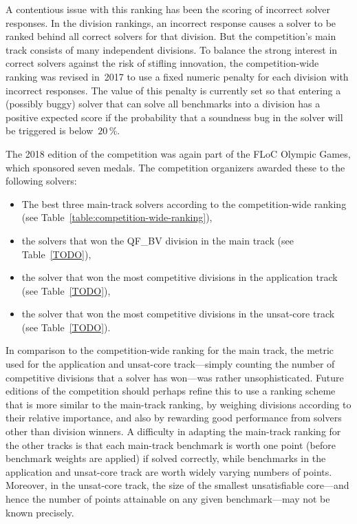 \documentclass[twoside,11pt]{article}
\begin{document}
A contentious issue with this ranking has been the scoring of
incorrect solver responses.  In the division rankings, an incorrect
response causes a solver to be ranked behind all correct solvers for
that division.  But the competition's main track consists of many
independent divisions.  To balance the strong interest in correct
solvers against the risk of stifling innovation, the competition-wide
ranking was revised in~2017 to use a fixed numeric penalty for each
division with incorrect responses.  The value of this penalty is
currently set so that entering a (possibly buggy) solver that can
solve all benchmarks into a division has a positive expected score if
the probability that a soundness bug in the solver will be triggered
is below~$20\,\%$.~\cite{rules18}

The 2018 edition of the competition was again part of the FLoC Olympic
Games, which sponsored seven medals.  The competition organizers
awarded these to the following solvers:
\begin{itemize}
\item The best three main-track solvers according to the
  competition-wide ranking (see
  Table~\ref{table:competition-wide-ranking}),
\item the solvers that won the QF\_BV division in the main track (see
  Table~\ref{TODO}),
\item the solver that won the most competitive divisions in the
  application track (see Table~\ref{TODO}),
\item the solver that won the most competitive divisions in the
  unsat-core track (see Table~\ref{TODO}).
\end{itemize}


In comparison to the competition-wide ranking for the main track, the
metric used for the application and unsat-core track---simply counting
the number of competitive divisions that a solver has won---was rather
unsophisticated.  Future editions of the competition should perhaps
refine this to use a ranking scheme that is more similar to the
main-track ranking, by weighing divisions according to their relative
importance, and also by rewarding good performance from solvers other
than division winners.  A difficulty in adapting the main-track
ranking for the other tracks is that each main-track benchmark is
worth one point (before benchmark weights are applied) if solved
correctly, while benchmarks in the application and unsat-core track
are worth widely varying numbers of points.  Moreover, in the
unsat-core track, the size of the smallest unsatisfiable core---and
hence the number of points attainable on any given benchmark---may not
be known precisely.
\end{document}

